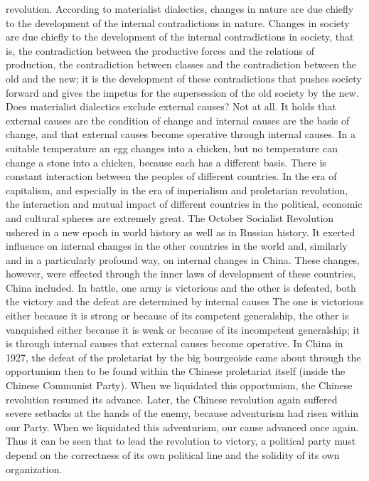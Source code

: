 \documentclass{article}
\begin{document}
revolution. According to materialist dialectics, changes in nature are due
chiefly to the development of the internal contradictions in nature.
Changes in society are due chiefly to the development of the internal
contradictions in society, that is, the contradiction between the
productive forces and the relations of production, the contradiction
between classes and the contradiction between the old and the new; it is
the development of these contradictions that pushes society forward and
gives the impetus for the supersession of the old society by the new. Does
materialist dialectics exclude external causes? Not at all. It holds that
external causes are the condition of change and internal causes are the
basis of change, and that external causes become operative through
internal causes. In a suitable temperature an egg changes into a chicken,
but no temperature can change a stone into a chicken, because each has
a different basis. There is constant interaction between the peoples of
different countries. In the era of capitalism, and especially in the era
of imperialism and proletarian revolution, the interaction and mutual
impact of different countries in the political, economic and cultural
spheres are extremely great. The October Socialist Revolution ushered in
a new epoch in world history as well as in Russian history. It exerted
influence on internal changes in the other countries in the world and,
similarly and in a particularly profound way, on internal changes in
China. These changes, however, were effected through the inner laws of
development of these countries, China included. In battle, one army is
victorious and the other is defeated, both the victory and the defeat are
determined by internal causes The one is victorious either because it is
strong or because of its competent generalship, the other is vanquished
either because it is weak or because of its incompetent generalship; it is
through internal causes that external causes become operative. In China in
1927, the defeat of the proletariat by the big bourgeoisie came about
through the opportunism then to be found within the Chinese proletariat
itself (inside the Chinese Communist Party). When we liquidated this
opportunism, the Chinese revolution resumed its advance. Later, the
Chinese revolution again suffered severe setbacks at the hands of the
enemy, because adventurism had risen within our Party. When we liquidated
this adventurism, our cause advanced once again. Thus it can be seen that
to lead the revolution to victory, a political party must depend on the
correctness of its own political line and the solidity of its own
organization.
\end{document}
